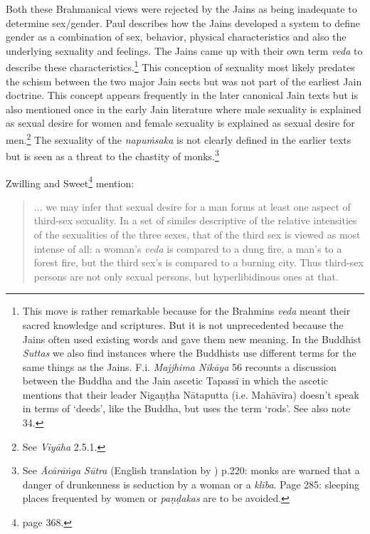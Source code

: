Both these Brahmanical views were rejected by the Jains as being inadequate to determine sex/gender. Paul \cite{dundas} describes how the Jains developed a system to define gender as a combination of sex, behavior, physical characteristics and also the underlying sexuality and feelings. The Jains came up with their own term {\em veda} to describe these characteristics.\footnote{This move is rather remarkable because for the Brahmins {\em veda} meant their sacred knowledge and scriptures. But it is not unprecedented because the Jains often used existing words and gave them new meaning. In the Buddhist {\em Suttas} we also find instances where the Buddhists use different terms for the same things as the Jains. F.i. {\em Majjhima Nikāya} 56 recounts a discussion between the Buddha and the Jain ascetic Tapassī in which the ascetic mentions that their leader Nigaṇṭha Nātaputta (i.e. Mahāvīra) doesn’t speak in terms of ‘deeds’, like the Buddha, but uses the term ‘rods’. See also \cite{zwilling} note 34.} This conception of sexuality most likely predates the schism between the two major Jain sects but was not part of the earliest Jain doctrine. This concept appears frequently in the later canonical Jain texts but is also mentioned once in the early Jain literature where male sexuality is explained as sexual desire for women and female sexuality is explained as sexual desire for men.\footnote{See {\em Viyāha} 2.5.1.} The sexuality of the {\em napuṁsaka} is not clearly defined in the earlier texts but is seen as a threat to the chastity of monks.\footnote{See {\em Ācārāṅga Sūtra} (English translation by \cite{jacobi}) p.220: monks are warned that a danger of drunkenness is seduction by a woman or a {\em klība}. Page 285: sleeping places frequented by women or {\em paṇḍakas} are to be avoided.}

Zwilling and Sweet\footnote{\cite{zwilling} page 368.} mention:

\begin{quote}
... we may infer that sexual desire for a man forms at least one aspect of third-sex sexuality. In a set of similes descriptive of the relative intensities of the sexualities of the three sexes, that of the third sex is viewed as most intense of all: a woman's {\em veda} is compared to a dung fire, a man's to a forest fire, but the third sex's is compared to a burning city. Thus third-sex persons are not only sexual persons, but hyperlibidinous ones at that.
\end{quote}

